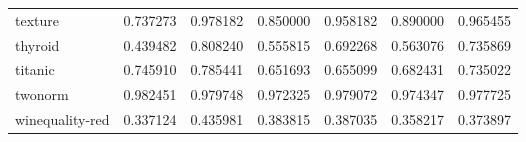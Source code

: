 \begin{tabular}{lrrrrrr}
texture         &         0.737273 &  0.978182 &                  0.850000 &       0.958182 &                  0.890000 &       0.965455 \\
thyroid         &         0.439482 &  0.808240 &                  0.555815 &       0.692268 &                  0.563076 &       0.735869 \\
titanic         &         0.745910 &  0.785441 &                  0.651693 &       0.655099 &                  0.682431 &       0.735022 \\
twonorm         &         0.982451 &  0.979748 &                  0.972325 &       0.979072 &                  0.974347 &       0.977725 \\
winequality-red &         0.337124 &  0.435981 &                  0.383815 &       0.387035 &                  0.358217 &       0.373897 \\
\bottomrule
\end{tabular}
